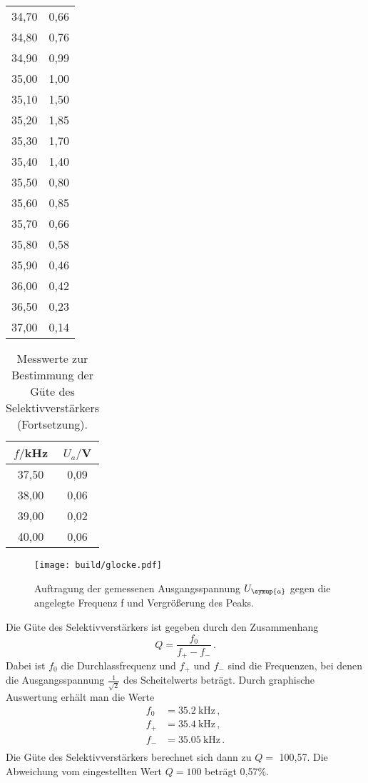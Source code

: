 \begin{table}[htp]
\begin{center}
\begin{tabular}{cc}
			34,70 & 0,66\\
			34,80 & 0,76\\
			34,90 & 0,99\\
			35,00 & 1,00\\
			35,10 & 1,50\\
			35,20 & 1,85\\
			35,30 & 1,70\\
			35,40 & 1,40\\
			35,50 & 0,80\\
			35,60 & 0,85\\
			35,70 & 0,66\\
			35,80 & 0,58\\
			35,90 & 0,46\\
			36,00 & 0,42\\
      36,50 & 0,23\\
      37,00 & 0,14\\
		\bottomrule
		\end{tabular}
	\end{center}
\end{table}
\begin{table}[htp]
	\begin{center}
    \caption{Messwerte zur Bestimmung der Güte des Selektivverstärkers (Fortsetzung).}
    \label{tab:guete2}
		\begin{tabular}{cc}
		\toprule
			{$f/$kHz} & {$U_a/$V}\\
			\midrule
			37,50 & 0,09\\
			38,00 & 0,06\\
			39,00 & 0,02\\
			40,00 & 0,06\\
		\bottomrule
		\end{tabular}
	\end{center}
\end{table}

\begin{figure}
  \centering
  \texttt{[image: build/glocke.pdf]}
  \caption{Auftragung der gemessenen Ausgangsspannung $U_{\symup{a}}$ gegen die angelegte
  Frequenz f und Vergrößerung des Peaks.}
  \label{fig:guete}
\end{figure}

Die Güte des Selektivverstärkers ist gegeben durch den Zusammenhang
\begin{equation}
  Q=\frac{f_0}{f_{+} - f_{-}} \,.
\end{equation}
Dabei ist $f_0$ die Durchlassfrequenz und $f_{+}$ und $f_{-}$ sind die Frequenzen,
bei denen die Ausgangsspannung $\frac{1}{\sqrt{2}}$ des Scheitelwerts beträgt. Durch
graphische Auswertung erhält man die Werte
\begin{align*}
  f_0&=\SI{35.2}{\kilo\hertz}      \,,\\
  f_{+}&=\SI{35.4}{\kilo\hertz}     \,, \\
  f_{-}&=\SI{35.05}{\kilo\hertz}     \,.\\
\end{align*}
Die Güte des Selektivverstärkers berechnet sich dann zu $Q=$ 100,57. Die Abweichung
vom eingestellten Wert $Q=100$ beträgt 0,57\%.

